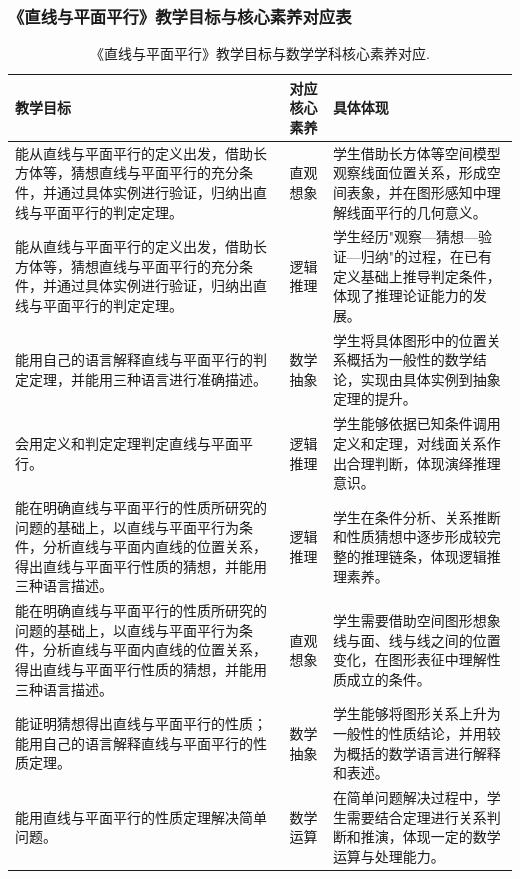 \documentclass[UTF8,a4paper,12pt,twoside]{ctexart}
\begin{document}
\subsubsection{《直线与平面平行》教学目标与核心素养对应表}

\renewcommand\arraystretch{1.5}
\begin{longtable}{|>{\centering\arraybackslash}p{}|>{\centering\arraybackslash}p{}|>{\centering\arraybackslash}p{}|}
\caption{\label{tab4.1}《直线与平面平行》教学目标与数学学科核心素养对应.} \\
\hline
教学目标 & 对应核心素养 & 具体体现 \\
\hline
能从直线与平面平行的定义出发，借助长方体等，猜想直线与平面平行的充分条件，并通过具体实例进行验证，归纳出直线与平面平行的判定定理。 & 直观想象 & 学生借助长方体等空间模型观察线面位置关系，形成空间表象，并在图形感知中理解线面平行的几何意义。 \\
\hline
能从直线与平面平行的定义出发，借助长方体等，猜想直线与平面平行的充分条件，并通过具体实例进行验证，归纳出直线与平面平行的判定定理。 & 逻辑推理 & 学生经历"观察—猜想—验证—归纳"的过程，在已有定义基础上推导判定条件，体现了推理论证能力的发展。 \\
\hline
能用自己的语言解释直线与平面平行的判定定理，并能用三种语言进行准确描述。 & 数学抽象 & 学生将具体图形中的位置关系概括为一般性的数学结论，实现由具体实例到抽象定理的提升。 \\
\hline
会用定义和判定定理判定直线与平面平行。 & 逻辑推理 & 学生能够依据已知条件调用定义和定理，对线面关系作出合理判断，体现演绎推理意识。 \\
\hline
能在明确直线与平面平行的性质所研究的问题的基础上，以直线与平面平行为条件，分析直线与平面内直线的位置关系，得出直线与平面平行性质的猜想，并能用三种语言描述。 & 逻辑推理 & 学生在条件分析、关系推断和性质猜想中逐步形成较完整的推理链条，体现逻辑推理素养。 \\
\hline
能在明确直线与平面平行的性质所研究的问题的基础上，以直线与平面平行为条件，分析直线与平面内直线的位置关系，得出直线与平面平行性质的猜想，并能用三种语言描述。 & 直观想象 & 学生需要借助空间图形想象线与面、线与线之间的位置变化，在图形表征中理解性质成立的条件。 \\
\hline
能证明猜想得出直线与平面平行的性质；能用自己的语言解释直线与平面平行的性质定理。 & 数学抽象 & 学生能够将图形关系上升为一般性的性质结论，并用较为概括的数学语言进行解释和表述。 \\
\hline
能用直线与平面平行的性质定理解决简单问题。 & 数学运算 & 在简单问题解决过程中，学生需要结合定理进行关系判断和推演，体现一定的数学运算与处理能力。 \\
\hline
\end{longtable}
\end{document}
